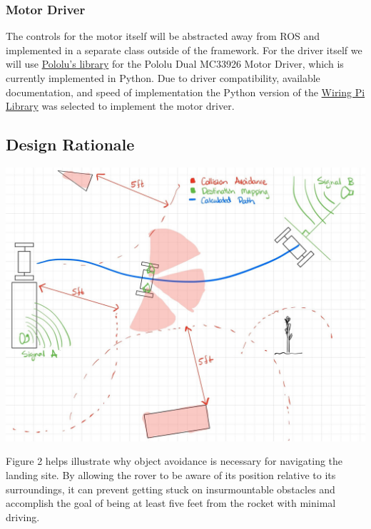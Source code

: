 \documentclass[onecolumn, draftclsnofoot,10pt, compsoc]{IEEEtran}
\begin{document}
\subsubsection{Motor Driver}
The controls for the motor itself will be abstracted away from ROS and implemented in a separate class outside of the framework. For the driver itself we will use \href{https://github.com/pololu/dual-mc33926-motor-driver-rpi}{Pololu's library} for the Pololu Dual MC33926 Motor Driver, which is currently implemented in Python. Due to driver compatibility, available documentation, and speed of implementation the Python version of the \href{http://wiringpi.com/}{Wiring Pi Library} was selected to implement the motor driver.

\subsection{Design Rationale}
\begin{minipage}{\linewidth}
	\begin{center}
		\includegraphics[width=\textwidth]{ManuverDiagram}
	\end{center}
\end{minipage}
Figure 2 helps illustrate why object avoidance is necessary for navigating the landing site. By allowing the rover to be aware of its position relative to its surroundings, it can prevent getting stuck on insurmountable obstacles and accomplish the goal of being at least five feet from the rocket with minimal driving. 
\end{document}
